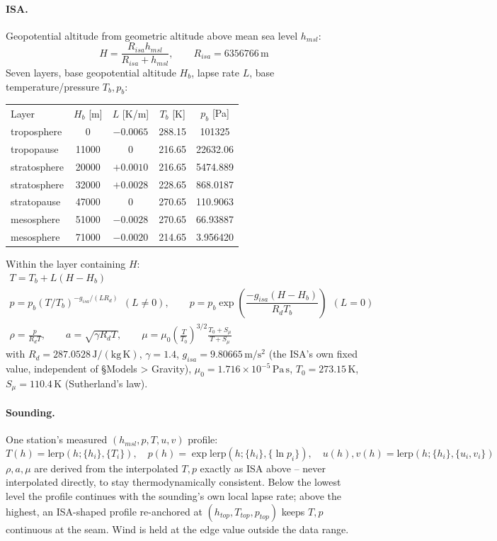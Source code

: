 \documentclass[10pt]{extarticle}
\numberwithin{equation}{subsubsection}
\begin{document}
\paragraph{ISA.} Geopotential altitude from geometric altitude above mean sea level $h_{msl}$:
\begin{equation}
    H = \frac{R_{isa}h_{msl}}{R_{isa}+h_{msl}}, \qquad R_{isa} = 6356766\,\mathrm{m}
\end{equation}
Seven layers, base geopotential altitude $H_b$, lapse rate $L$, base temperature/pressure $T_b, p_b$:
\begin{center}
\begin{tabular}{l c c c c}
Layer & $H_b$ [m] & $L$ [K/m] & $T_b$ [K] & $p_b$ [Pa] \\
troposphere  & 0     & $-0.0065$ & 288.15 & 101325   \\
tropopause   & 11000 & $0$       & 216.65 & 22632.06 \\
stratosphere & 20000 & $+0.0010$ & 216.65 & 5474.889 \\
stratosphere & 32000 & $+0.0028$ & 228.65 & 868.0187 \\
stratopause  & 47000 & $0$       & 270.65 & 110.9063 \\
mesosphere   & 51000 & $-0.0028$ & 270.65 & 66.93887 \\
mesosphere   & 71000 & $-0.0020$ & 214.65 & 3.956420 \\
\end{tabular}
\end{center}
Within the layer containing $H$:
\begin{gather}
    T = T_b + L(H-H_b) \\
    p = p_b(T/T_b)^{-g_{isa}/(LR_d)} \ \ (L\neq0), \qquad
    p = p_b\exp\!\left(\dfrac{-g_{isa}(H-H_b)}{R_dT_b}\right) \ \ (L=0) \\
    \rho = \frac{p}{R_dT}, \qquad a = \sqrt{\gamma R_dT}, \qquad
    \mu = \mu_0\left(\frac{T}{T_0}\right)^{3/2}\frac{T_0+S_\mu}{T+S_\mu}
\end{gather}
with $R_d = 287.0528\,\mathrm{J/(kg\,K)}$, $\gamma = 1.4$, $g_{isa} = 9.80665\,\mathrm{m/s^2}$ (the
ISA's own fixed value, independent of \S Models > Gravity), $\mu_0 = 1.716\times10^{-5}\,\mathrm{Pa\,s}$,
$T_0 = 273.15\,\mathrm{K}$, $S_\mu = 110.4\,\mathrm{K}$ (Sutherland's law).

\paragraph{Sounding.} One station's measured $(h_{msl}, p, T, u, v)$ profile:
\begin{equation}
    T(h) = \mathrm{lerp}(h;\{h_i\},\{T_i\}), \quad
    p(h) = \exp\mathrm{lerp}(h;\{h_i\},\{\ln p_i\}), \quad
    u(h),v(h) = \mathrm{lerp}(h;\{h_i\},\{u_i,v_i\})
\end{equation}
$\rho, a, \mu$ are derived from the interpolated $T, p$ exactly as ISA above -- never interpolated
directly, to stay thermodynamically consistent. Below the lowest level the profile continues with
the sounding's own local lapse rate; above the highest, an ISA-shaped profile re-anchored at
$(h_{top}, T_{top}, p_{top})$ keeps $T, p$ continuous at the seam. Wind is held at the edge value
outside the data range.
\end{document}
